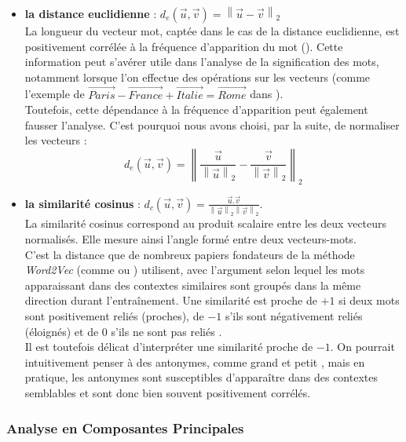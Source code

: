 \documentclass[11pt,french,french]{article}
\providecommand{\tightlist}{%
  \setlength{\parskip}{0pt}
  }
\begin{document}
\begin{itemize}
\tightlist
\item
  \textbf{la distance euclidienne} : \(d_{e}(\vec{u},\vec{v}) = \left\| \vec{u} - \vec{v} \right\|_2\)\\
  La longueur du vecteur mot, captée dans le cas de la distance euclidienne, est positivement corrélée à la fréquence d'apparition du mot (\cite{Schakel}). Cette information peut s'avérer utile dans l'analyse de la signification des mots, notamment lorsque l'on effectue des opérations sur les vecteurs (comme l'exemple de \(\overrightarrow{Paris} - \overrightarrow{France} + \overrightarrow{Italie} = \overrightarrow{Rome}\) dans \cite{Mikolov}).\\
  Toutefois, cette dépendance à la fréquence d'apparition peut également fausser l'analyse. C'est pourquoi nous avons choisi, par la suite, de normaliser les vecteurs :
  \[ d_{e}(\vec{u},\vec{v}) = \left\| \frac{\vec{u}}{\left\| \vec{u} \right\|_2} - \frac{\vec{v}}{\left\| \vec{v} \right\|_2}  \right\|_2\]
\item
  \textbf{la similarité cosinus} : \(d_{c}(\vec{u}, \vec{v}) = \frac{\vec{u}.\vec{v}}{\left\| \vec{u} \right\|_2 \left\| \vec{v} \right\|_2 }\).\\
  La similarité cosinus correspond au produit scalaire entre les deux vecteurs normalisés. Elle mesure ainsi l'angle formé entre deux vecteurs-mots.\\
  C'est la distance que de nombreux papiers fondateurs de la méthode \emph{Word2Vec} (comme \cite{Mikolov} ou \cite{Levy}) utilisent, avec l'argument selon lequel les mots apparaissant dans des contextes similaires sont groupés dans la même direction durant l'entraînement.
  Une similarité est proche de \(+1\) si deux mots sont positivement reliés (proches), de \(-1\) s'ils sont négativement reliés (éloignés) et de 0 s'ils ne sont pas \og reliés \fg{}.\\
  Il est toutefois délicat d'interpréter une similarité proche de \(-1\). On pourrait intuitivement penser à des antonymes, comme \og grand \fg{} et \og petit \fg{}, mais en pratique, les antonymes sont susceptibles d'apparaître dans des contextes semblables et sont donc bien souvent positivement corrélés.
\end{itemize}

\hypertarget{analyse-en-composantes-principales}{%
\subsubsection{Analyse en Composantes Principales}\label{analyse-en-composantes-principales}}
\end{document}
